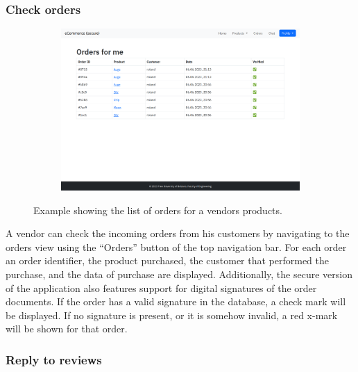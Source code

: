 \documentclass[conference,onecolumn,a4paper]{IEEEtran}
\begin{document}
\subsubsection{Check orders}

\begin{figure}[H]
    \centering
    \begin{subfigure}[b]{0.4\linewidth}
        \includegraphics[width=\linewidth]{resources/orders.png}
    \end{subfigure}
    \caption{Example showing the list of orders for a vendors products.}
\end{figure}

A vendor can check the incoming orders from his customers by navigating to the orders view using the “Orders” button of the top navigation bar. For each order an order identifier, the product purchased, the customer that performed the purchase, and the data of purchase are displayed. Additionally, the secure version of the application also features support for digital signatures of the order documents. If the order has a valid signature in the database, a check mark will be displayed. If no signature is present, or it is somehow invalid, a red x-mark will be shown for that order.

\subsubsection{Reply to reviews}
\end{document}
